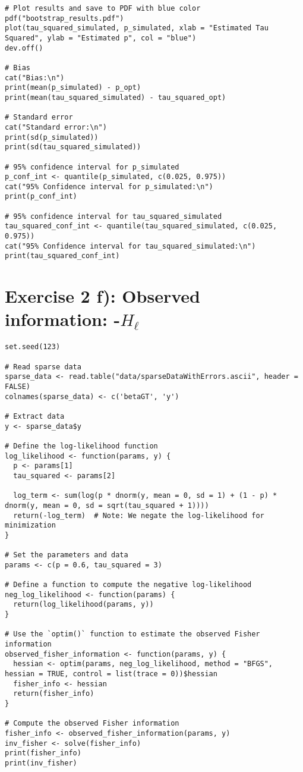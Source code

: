 \begin{tcolorbox}[colback=white!95!black,colframe=white!50!black, breakable]
\begin{lstlisting}[caption={Exercise 2e}, label={lst:tau_p_est}]
# Plot results and save to PDF with blue color
pdf("bootstrap_results.pdf")
plot(tau_squared_simulated, p_simulated, xlab = "Estimated Tau Squared", ylab = "Estimated p", col = "blue")
dev.off()

# Bias
cat("Bias:\n")
print(mean(p_simulated) - p_opt)
print(mean(tau_squared_simulated) - tau_squared_opt)

# Standard error
cat("Standard error:\n")
print(sd(p_simulated))
print(sd(tau_squared_simulated))

# 95% confidence interval for p_simulated
p_conf_int <- quantile(p_simulated, c(0.025, 0.975))
cat("95% Confidence interval for p_simulated:\n")
print(p_conf_int)

# 95% confidence interval for tau_squared_simulated
tau_squared_conf_int <- quantile(tau_squared_simulated, c(0.025, 0.975))
cat("95% Confidence interval for tau_squared_simulated:\n")
print(tau_squared_conf_int)
\end{lstlisting}
\end{tcolorbox}

\section*{Exercise 2 f): Observed information: -$H_\ell$}
\begin{tcolorbox}[colback=white!95!black,colframe=white!50!black]
\begin{lstlisting}[caption={Exercise 2f}, label={lst:fisher_inf}]
set.seed(123)

# Read sparse data
sparse_data <- read.table("data/sparseDataWithErrors.ascii", header = FALSE)
colnames(sparse_data) <- c('betaGT', 'y')

# Extract data
y <- sparse_data$y

# Define the log-likelihood function
log_likelihood <- function(params, y) {
  p <- params[1]
  tau_squared <- params[2]
  
  log_term <- sum(log(p * dnorm(y, mean = 0, sd = 1) + (1 - p) * dnorm(y, mean = 0, sd = sqrt(tau_squared + 1))))
  return(-log_term)  # Note: We negate the log-likelihood for minimization
}

# Set the parameters and data
params <- c(p = 0.6, tau_squared = 3)

# Define a function to compute the negative log-likelihood
neg_log_likelihood <- function(params) {
  return(log_likelihood(params, y))
}

# Use the `optim()` function to estimate the observed Fisher information
observed_fisher_information <- function(params, y) {
  hessian <- optim(params, neg_log_likelihood, method = "BFGS", hessian = TRUE, control = list(trace = 0))$hessian
  fisher_info <- hessian
  return(fisher_info)
}

# Compute the observed Fisher information
fisher_info <- observed_fisher_information(params, y)
inv_fisher <- solve(fisher_info)
print(fisher_info)
print(inv_fisher)
\end{lstlisting}
\end{tcolorbox}
\vspace{15mm}
